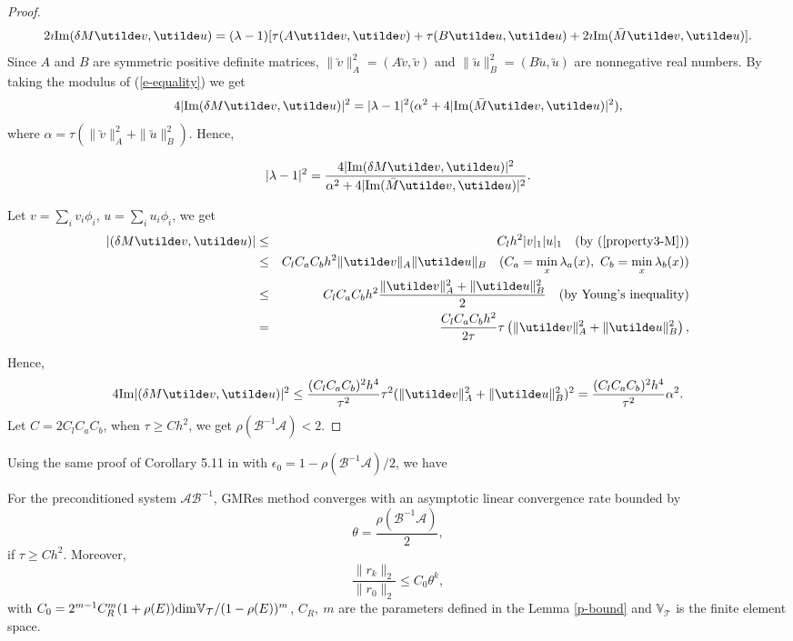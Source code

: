 \documentclass[smallcondensed]{svjour3}
\numberwithin{equation}{section} \numberwithin{table}{section}
\numberwithin{figure}{section}
\numberwithin{algorithm}{section}
\begin{document}
\begin{proof}
\begin{equation}
2\imath{\rm Im}(\delta M\utilde v,\utilde u)=(\lambda-1)[\tau(A\utilde v,\utilde v)+\tau(B\utilde u,\utilde u)+2\imath{\rm{Im}}(\bar M\utilde v,\utilde u)].
\label{e-equality}
\end{equation}
Since $A$ and $B$ are symmetric positive definite matrices, $\|\utilde v\|^2_A=(A\utilde v, \utilde v)$ and $\|\utilde u\|^2_B=(B\utilde u, \utilde u)$ are nonnegative real numbers. By taking the modulus of (\ref{e-equality}) we get
\begin{equation*}
4|{\rm Im}(\delta M\utilde v, \utilde u)|^2=|\lambda-1|^2(\alpha^2+4|{\rm Im}(\bar{M}\utilde v,\utilde u)|^2),
\end{equation*}
where $\alpha=\tau(\|\utilde v\|_{A}^2+\|\utilde u\|_B^2)$. Hence,

\begin{equation}\label{lambdaval}
|\lambda-1|^2=\frac{4|{\rm Im}(\delta M\utilde v, \utilde u)|^2}{\alpha^2+4|{\rm{Im}}(\bar{M}\utilde v,\utilde u)|^2}.
\end{equation}

Let $v={\textstyle\sum}_i v_i\phi_i$, $u={\textstyle\sum}_i u_i\phi_i$, we get
\begin{eqnarray*}
|(\delta M\utilde v,\utilde u)|&\leq& C_l h^2|v|_1|u|_1 \quad \text{(by (\ref{property3-M}))}\\
                     &\leq& C_l C_{a}C_{b}h^2\|\utilde v\|_A\|\utilde u\|_B \quad (C_a=\min_{x}\lambda_a(x),\ C_b=\min_{x}\lambda_b(x))\\
                     &\leq& C_l C_{a}C_{b}h^2\frac{\|\utilde v\|_A^2+\|\utilde u\|^2_B}{2} \quad
                     \text{(by Young's inequality)}\\
                     & = & \frac{C_l C_{a}C_{b}h^2}{2\tau}\tau\left(\|\utilde v\|_A^2+\|\utilde u\|^2_B\right),
\end{eqnarray*}

Hence,
\begin{align*}
4{\rm Im}|(\delta M\utilde v,\utilde u)|^2 \leq\frac{(C_lC_aC_b)^2h^4}{\tau^2}\tau^2(\|\utilde v\|_A^2+\|\utilde u\|_B^2)^2 = \frac{(C_lC_aC_b)^2h^4}{\tau^2}\alpha^2.              
\end{align*}
Let $C = 2C_lC_aC_b$, when $\tau\geq Ch^2$, we get $\rho(\mathcal{B}^{-1}\mathcal{A})<2$.

\end{proof}
Using the same proof of Corollary 5.11 in \cite{bansch2011preconditioning} with $\epsilon_0={1-\rho(\mathcal{B}^{-1}\mathcal{A})/2}$, we have 
\begin{corollary} \label{GMRes_lump}
For the preconditioned system $\mathcal{A}\mathcal{B}^{-1}$, GMRes method converges with an asymptotic linear convergence rate bounded by
$$
\theta = \frac{\rho(\mathcal{B}^{-1}\mathcal{A})}{2},
$$
if $\tau\geq Ch^2$.
Moreover, 
$$
\frac{\|r_k\|_2}{\|r_0\|_2}\leq C_0\theta^k,
$$
with $C_0=2^{m-1}C_R^m(1+\rho(E)){\rm dim}\mathbb{V}_\mathcal{T}/(1-\rho(E))^m$, $C_R, \ m$ are the parameters defined in the Lemma \ref{p-bound} and $\mathbb{V}_\mathcal{T}$ is the finite element space.
\end{corollary}
\end{document}
